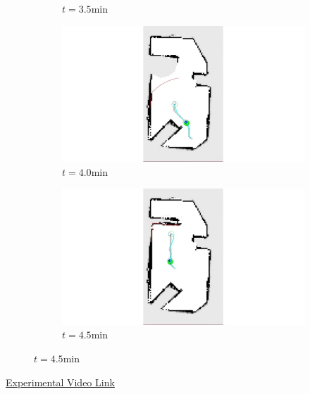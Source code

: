 \documentclass[11pt,professionalfonts,hyperref={pdftex,pdfpagemode=none,pdfstartview=FitH}]{beamer}
\begin{document}
\begin{frame}
\begin{figure}
{\begin{subfigure}[b]{0.19\textwidth}
        		\caption*{$t=3.5$min}
        		\label{fig:Experiment_ogm_t3p5}
    	\end{subfigure}
	\begin{subfigure}[b]{0.19\textwidth}
        		\includegraphics[trim={13cm 1cm 13cm 0}, clip, width=\textwidth]{t_4min.jpg}
        		\caption*{$t=4.0$min}
        		\label{fig:Experiment_ogm_t4}
    	\end{subfigure}
	\begin{subfigure}[b]{0.19\textwidth}
        		\includegraphics[trim={13cm 1cm 13cm 0}, clip, width=\textwidth]{t_4p5min.jpg}
        		\caption*{$t=4.5$min}
        		\label{fig:Experiment_ogm_t4p5}
    	\end{subfigure}
	}
\end{figure}
\vspace{-0.5cm}

\href{run:JIRS16_experiment_SideBySide_speedup8x.mov}{\tiny Experimental Video Link}

\end{frame}
\end{document}
